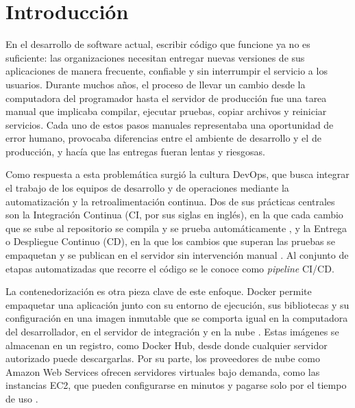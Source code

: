 \documentclass[12pt,letterpaper]{article}
\begin{document}
\section{Introducción}

En el desarrollo de software actual, escribir código que funcione ya no es suficiente: las organizaciones necesitan entregar nuevas versiones de sus aplicaciones de manera frecuente, confiable y sin interrumpir el servicio a los usuarios. Durante muchos años, el proceso de llevar un cambio desde la computadora del programador hasta el servidor de producción fue una tarea manual que implicaba compilar, ejecutar pruebas, copiar archivos y reiniciar servicios. Cada uno de estos pasos manuales representaba una oportunidad de error humano, provocaba diferencias entre el ambiente de desarrollo y el de producción, y hacía que las entregas fueran lentas y riesgosas.

Como respuesta a esta problemática surgió la cultura DevOps, que busca integrar el trabajo de los equipos de desarrollo y de operaciones mediante la automatización y la retroalimentación continua. Dos de sus prácticas centrales son la Integración Continua (CI, por sus siglas en inglés), en la que cada cambio que se sube al repositorio se compila y se prueba automáticamente \cite{fowler}, y la Entrega o Despliegue Continuo (CD), en la que los cambios que superan las pruebas se empaquetan y se publican en el servidor sin intervención manual \cite{humble}. Al conjunto de etapas automatizadas que recorre el código se le conoce como \emph{pipeline} CI/CD.

La contenedorización es otra pieza clave de este enfoque. Docker permite empaquetar una aplicación junto con su entorno de ejecución, sus bibliotecas y su configuración en una imagen inmutable que se comporta igual en la computadora del desarrollador, en el servidor de integración y en la nube \cite{merkel,dockerdocs}. Estas imágenes se almacenan en un registro, como Docker Hub, desde donde cualquier servidor autorizado puede descargarlas. Por su parte, los proveedores de nube como Amazon Web Services ofrecen servidores virtuales bajo demanda, como las instancias EC2, que pueden configurarse en minutos y pagarse solo por el tiempo de uso \cite{awsec2}.
\end{document}
